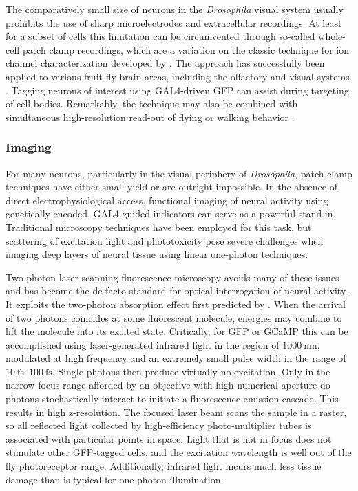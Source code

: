 The comparatively small size of neurons in the \textit{Drosophila} visual system usually prohibits the use of sharp microelectrodes and extracellular recordings. At least for a subset of cells this limitation can be circumvented through so-called whole-cell patch clamp recordings, which are a variation on the classic technique for ion channel characterization developed by \citet{Sakmann:1984aa}. The approach has successfully been applied to various fruit fly brain areas, including the olfactory \citep{Wilson:2004aa,Murthy:2008aa} and visual systems \citep{Joesch:2008fo,Behnia:2014jh}. Tagging neurons of interest using GAL4-driven GFP can assist during targeting of cell bodies. Remarkably, the technique may also be combined with simultaneous high-resolution read-out of flying or walking behavior \citep{Maimon:2010jy,Chiappe:2010cl}.

\subsubsection{Imaging}

For many neurons, particularly in the visual periphery of \textit{Drosophila}, patch clamp techniques have either small yield or are outright impossible. In the absence of direct electrophysiological access, functional imaging of neural activity using genetically encoded, GAL4-guided indicators can serve as a powerful stand-in. Traditional microscopy techniques have been employed for this task, but scattering of excitation light and phototoxicity pose severe challenges when imaging deep layers of neural tissue using linear one-photon techniques.

Two-photon laser-scanning fluorescence microscopy avoids many of these issues and has become the de-facto standard for optical interrogation of neural activity \citep{Denk:1990aa,Helmchen:2005aa}. It exploits the two-photon absorption effect first predicted by \citet{Goppert:1931aa}. When the arrival of two photons coincides at some fluorescent molecule, energies may combine to lift the molecule into its excited state. Critically, for GFP or GCaMP this can be accomplished using laser-generated infrared light in the region of $\SI{1000}{\nano\meter}$, modulated at high frequency and an extremely small pulse width in the range of $\SIrange{10}{100}{\femto\second}$. Single photons then produce virtually no excitation. Only in the narrow focus range afforded by an objective with high numerical aperture do photons stochastically interact to initiate a fluorescence-emission cascade. This results in high z-resolution. The focused laser beam scans the sample in a raster, so all reflected light collected by high-efficiency photo-multiplier tubes is associated with particular points in space. Light that is not in focus does not stimulate other GFP-tagged cells, and the excitation wavelength is well out of the fly photoreceptor range. Additionally, infrared light incurs much less tissue damage than is typical for one-photon illumination.

